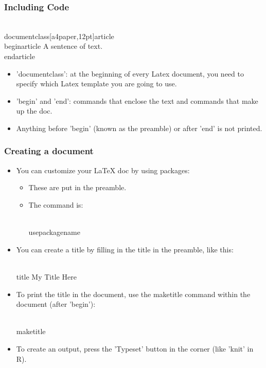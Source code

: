 \documentclass{beamer}
\begin{document}
\begin{frame}[fragile]
\frametitle{Including Code}
\begin{semiverbatim}
\\documentclass[a4paper,12pt]{article}
\\begin{article}
A sentence of text.
\\end{article}
\end{semiverbatim}

\begin{itemize}
	\setlength\itemsep{1em}
	\item 'documentclass': at the beginning of every Latex document, you need to specify which Latex template you are going to use.
	\item 'begin' and 'end': commands that enclose the text and commands that make up the doc.
	\item Anything before 'begin' (known as the preamble) or after 'end' is not printed.
\end{itemize}
\end{frame}


\begin{frame}[fragile]
\frametitle{Creating a document}
\begin{itemize}	
	\setlength\itemsep{1em}
	\item You can customize your LaTeX doc by using packages:
	 	\begin{itemize}	
	 	\item These are put in the preamble. 
		\item The command is:
		\begin{semiverbatim}
		 \\usepackage{name}
		 \end{semiverbatim}
		 \end{itemize}
	\item You can create a title by filling in the title in the preamble, like this:
	\begin{semiverbatim}
	 \\title{ My Title Here}
	  \end{semiverbatim}
	  \item To print the title in the document, use the maketitle command within the document (after 'begin'):
	  \begin{semiverbatim}
	   \\maketitle 
	    \end{semiverbatim}
	\item To create an output, press the 'Typeset' button in the corner (like 'knit' in R).
\end{itemize}
\end{frame}
\end{document}
